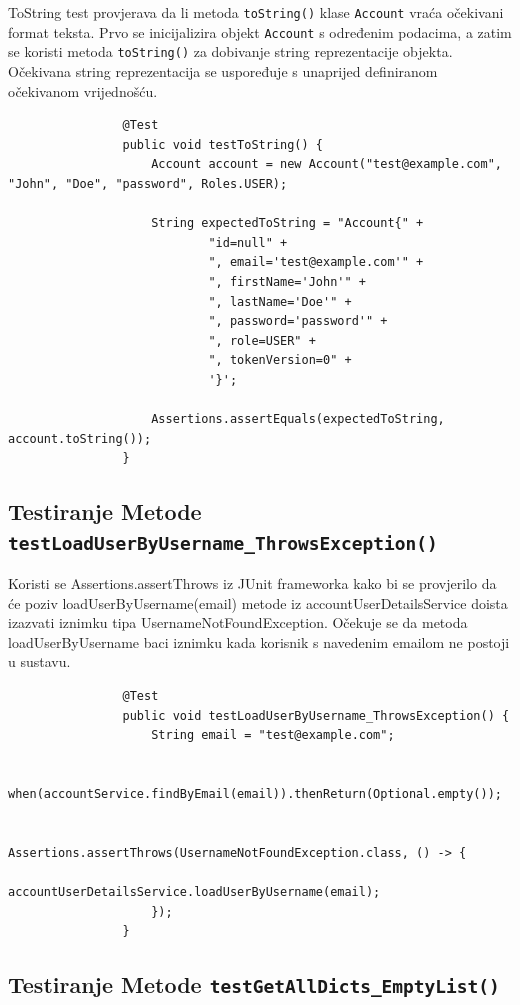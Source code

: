 
			ToString test provjerava da li metoda \texttt{toString()} klase \texttt{Account} vraća očekivani format teksta. Prvo se inicijalizira objekt \texttt{Account} s određenim podacima, a zatim se koristi metoda \texttt{toString()} za dobivanje string reprezentacije objekta. Očekivana string reprezentacija se uspoređuje s unaprijed definiranom očekivanom vrijednošću.

			\begin{lstlisting}
				@Test
				public void testToString() {
					Account account = new Account("test@example.com", "John", "Doe", "password", Roles.USER);
			
					String expectedToString = "Account{" +
							"id=null" +
							", email='test@example.com'" +
							", firstName='John'" +
							", lastName='Doe'" +
							", password='password'" +
							", role=USER" +
							", tokenVersion=0" +
							'}';
			
					Assertions.assertEquals(expectedToString, account.toString());
				}
			\end{lstlisting}

			\subsection{Testiranje Metode \texttt{testLoadUserByUsername_ThrowsException()}}

			Koristi se Assertions.assertThrows iz JUnit frameworka kako bi se provjerilo da će poziv loadUserByUsername(email) metode iz accountUserDetailsService doista izazvati iznimku tipa UsernameNotFoundException. Očekuje se da metoda loadUserByUsername baci iznimku kada korisnik s navedenim emailom ne postoji u sustavu.
			
			\begin{lstlisting}
				@Test
				public void testLoadUserByUsername_ThrowsException() {
					String email = "test@example.com";
			
					when(accountService.findByEmail(email)).thenReturn(Optional.empty());
			
					Assertions.assertThrows(UsernameNotFoundException.class, () -> {
						accountUserDetailsService.loadUserByUsername(email);
					});
				}
			\end{lstlisting}

			\subsection{Testiranje Metode \texttt{testGetAllDicts_EmptyList()}}	

